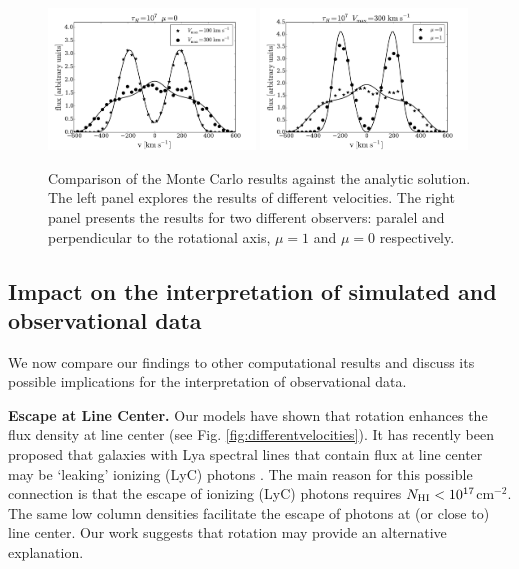 \documentclass{emulateapj}
\newcommand{\ly}{{\ifmmode{{\rm Ly}\alpha~}\else{Ly$\alpha$~}\fi}}
\begin{document}
\begin{figure}
\begin{center}
  \includegraphics[width=0.49\textwidth]{fig10a.pdf}
  \includegraphics[width=0.49\textwidth]{fig10b.pdf}
\end{center}
\caption{
Comparison of the Monte Carlo results against the analytic
solution. The left panel explores the results of different velocities.
The right panel presents the results for two different observers:
paralel and perpendicular to the rotational axis, $\mu=1$ and $\mu=0$
respectively.
\label{fig:comparison} }   
\end{figure}


\subsection{Impact on the interpretation of simulated and
  observational data}

We now compare our findings to other computational results and discuss
its possible implications  for the interpretation of observational data.

{\bf Escape at Line Center.} Our models have shown that rotation
enhances the flux density at line center (see Fig.     \ref{fig:differentvelocities}). It has
recently been proposed that galaxies with Lya spectral lines that
contain flux at line center may be `leaking' ionizing (LyC) photons
\citep{Behrens2014,2014arXiv1404.2958V}. The main reason for this possible
connection is that the escape of ionizing (LyC) photons requires
$N_{\rm HI} < 10^{17} $cm$^{-2}$. The same low column densities facilitate the escape of
\ly photons at (or close to) line center. Our work suggests that
rotation may provide an alternative explanation.
\end{document}
